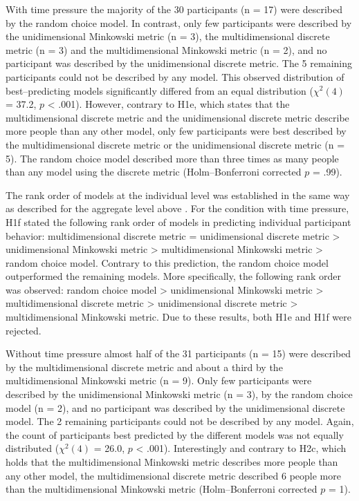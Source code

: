 \documentclass[a4paper,man,natbib]{apa6}
\begin{document}
With time pressure the majority of the 30 participants (n = 17) were described by the random choice model. In contrast, only few participants were described by the unidimensional Minkowski metric (n = 3), the multidimensional discrete metric (n = 3) and the multidimensional Minkowski metric (n = 2), and no participant was described by the unidimensional discrete metric. The 5 remaining participants could not be described by any model. This observed distribution of best--predicting models 
significantly differed from an equal distribution ($\chi^{2}(4)$ = 37.2, $p$ < .001). However, contrary to H1e, which states that the multidimensional discrete metric and the unidimensional discrete metric describe more people than any other model, only few participants were best described by the multidimensional discrete metric or the unidimensional discrete metric (n = 5). The random choice model described more than three times as many people than any model using the discrete metric (Holm--Bonferroni corrected $p$ = .99). 

The rank order of models at the individual level was established in the same way as described for the aggregate level above \citep[see also][p. 194]{wagenmakers2004aic}. For the condition with time pressure, H1f stated the following rank order of models in predicting individual participant behavior: multidimensional discrete metric = unidimensional discrete metric > unidimensional Minkowski metric > multidimensional Minkowski metric > random choice model. Contrary to this prediction, the random choice model outperformed the remaining models. More specifically, the following rank order was observed: random choice model > unidimensional Minkowski metric > multidimensional discrete metric > unidimensional discrete metric > multidimensional Minkowski metric. Due to these results, both H1e and H1f were rejected.

Without time pressure almost half of the 31 participants (n = 15) were described by the multidimensional discrete metric and about a third by the multidimensional Minkowski metric (n = 9). Only few participants were described by the unidimensional Minkowski metric (n = 3), by the random choice model (n = 2), and no participant was described by the unidimensional discrete model. The 2 remaining participants could not be described by any model. Again, the count of participants best predicted by the different models was not equally distributed ($\chi^{2}(4)$ = 26.0, $p$ < .001). Interestingly and contrary to H2c, which holds that the multidimensional Minkowski metric describes more people than any other model, the multidimensional discrete metric described 6 people more than the multidimensional Minkowski metric (Holm--Bonferroni corrected $p$ = 1). 
\end{document}
